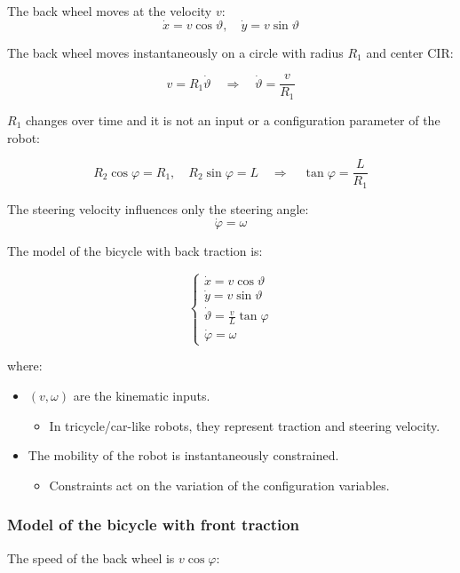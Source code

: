 The back wheel moves at the velocity $v$:  
\[
\dot{x} = v \cos \vartheta, \quad \dot{y} = v \sin \vartheta
\]
    
The back wheel moves instantaneously on a circle with radius $R_1$ and center CIR:  

\[
v = R_1 \dot{\vartheta} \quad \Rightarrow \quad \dot{\vartheta} = \frac{v}{R_1}
\]
    
$R_1$ changes over time and it is not an input or a configuration parameter of the robot: 

\[
R_2 \cos \varphi = R_1, \quad R_2 \sin \varphi = L \quad \Rightarrow \quad \tan \varphi = \frac{L}{R_1}
\]
    
The steering velocity influences only the steering angle:  
\[
\dot{\varphi} = \omega
\]

The model of the bicycle with back traction is:

\[
\begin{cases}
\dot{x} = v \cos \vartheta \\
\dot{y} = v \sin \vartheta \\
\dot{\vartheta} = \frac{v}{L} \tan \varphi \\
\dot{\varphi} = \omega
\end{cases}
\]

where:

\begin{itemize}
    \item $(v, \omega)$ are the kinematic inputs.  
    \begin{itemize}
        \item In tricycle/car-like robots, they represent traction and steering velocity.  
    \end{itemize}
    
    \item The mobility of the robot is instantaneously constrained.  
    \begin{itemize}
        \item Constraints act on the variation of the configuration variables.  
    \end{itemize}
\end{itemize}

\hfill

\subsubsection{Model of the bicycle with front traction}

The speed of the back wheel is $v \cos \varphi$:  

